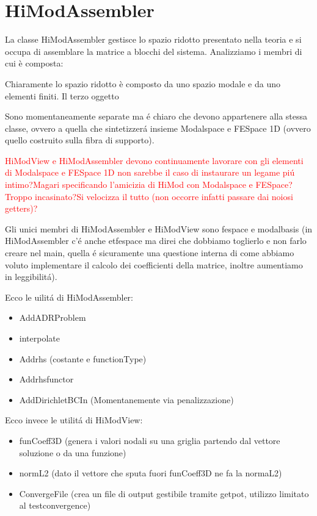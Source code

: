 \section{HiModAssembler}
 
 La classe HiModAssembler gestisce lo spazio ridotto presentato nella teoria e si occupa di assemblare la matrice a blocchi del sistema. 
Analizziamo i membri di cui \`e composta:


Chiaramente lo spazio ridotto \`e composto da uno spazio modale e da uno elementi finiti. Il terzo oggetto 




 Sono momentaneamente separate ma \'e chiaro che devono appartenere alla stessa classe, ovvero a quella che sintetizzer\'a insieme Modalspace e FESpace 1D (ovvero quello costruito sulla fibra di supporto).
 
 \textcolor{red}{HiModView e HiModAssembler devono continuamente lavorare con gli elementi di Modalspace e FESpace 1D non sarebbe il caso di instaurare un legame pi\'u intimo?Magari specificando l'amicizia di HiMod con Modalspace e FESpace?Troppo incasinato?Si velocizza il tutto (non occorre infatti passare dai noiosi getters)?}
 
Gli unici membri di HiModAssembler e HiModView sono fespace e modalbasis (in HiModAssembler c'\'e anche etfespace ma direi che dobbiamo toglierlo e non farlo creare nel main, quella \'e sicuramente una questione interna di come abbiamo voluto implementare il calcolo dei coefficienti della matrice, inoltre aumentiamo in leggibilit\'a).

Ecco le uilit\'a di HiModAssembler:
\begin{itemize}
\item AddADRProblem
\item interpolate
\item Addrhs (costante e functionType)
\item Addrhsfunctor
\item AddDirichletBCIn (Momentanemente via penalizzazione)
\end{itemize}

Ecco invece le utilit\'a di HiModView:
\begin{itemize}
\item funCoeff3D (genera i valori nodali su una griglia partendo dal vettore soluzione o da una funzione)
\item normL2 (dato il vettore che sputa fuori funCoeff3D ne fa la normaL2)
\item ConvergeFile (crea un file di output gestibile tramite getpot, utilizzo limitato al testconvergence)
\end{itemize}




